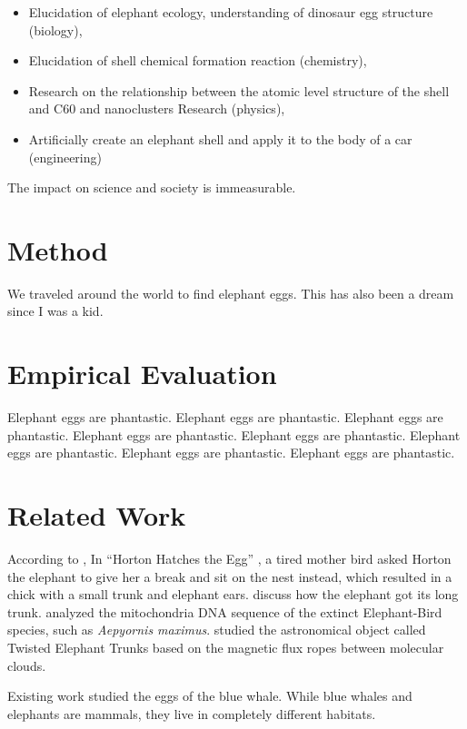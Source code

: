 \begin{itemize}
 \item Elucidation of elephant ecology, understanding of dinosaur egg structure (biology),
 \item Elucidation of shell chemical formation reaction (chemistry),
 \item Research on the relationship between the atomic level structure of the shell and C60 and nanoclusters Research (physics),
 \item Artificially create an elephant shell and apply it to the body of a car (engineering)
\end{itemize}

The impact on science and society is immeasurable.

\section{Method}

We traveled around the world to find elephant eggs. This has also been a dream since I was a kid. 

\section{Empirical Evaluation}

Elephant eggs are phantastic. 
Elephant eggs are phantastic. 
Elephant eggs are phantastic. 
Elephant eggs are phantastic. 
Elephant eggs are phantastic. 
Elephant eggs are phantastic. 
Elephant eggs are phantastic. 
Elephant eggs are phantastic. 

\section{Related Work}

According to \citet{folbre1997future},
In ``Horton Hatches the Egg'' \cite{seuss1968horton},
a tired mother bird asked Horton the elephant to give her a break and
sit on the nest instead, which resulted in a chick with a small trunk and
elephant ears.
\citet{kipling1983elephant} discuss how the elephant got its long trunk.
\citet{cooper2001complete} analyzed the mitochondria DNA sequence of the extinct Elephant-Bird species,
such as \emph{Aepyornis maximus}.
\citet{carlqvist2003theory} studied the astronomical object called Twisted Elephant Trunks
based on the magnetic flux ropes between molecular clouds.

Existing work studied the eggs of the blue whale.
While blue whales and elephants are mammals, they live in completely different habitats.

